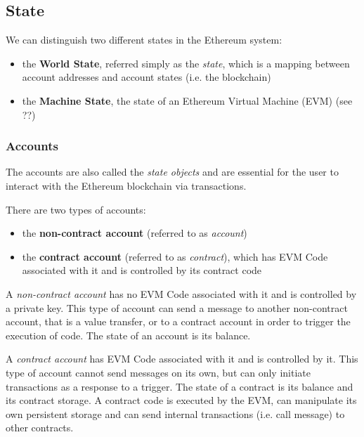 \subsection{State}

We can distinguish two different states in the Ethereum system:

\begin{itemize}
  \item the \textbf{World State}, referred simply as the \emph{state}, which is
  a mapping between account addresses and account states (i.e. the blockchain)
  \item the \textbf{Machine State}, the state of an Ethereum Virtual Machine
  (EVM) (see ??)
\end{itemize}

\subsubsection{Accounts}

The accounts are also called the \emph{state objects} and are essential for the
user to interact with the Ethereum blockchain via transactions.

There are two types of accounts:

\begin{itemize}
  \item the \textbf{non-contract account} (referred to as \emph{account})
  \item the \textbf{contract account} (referred to as \emph{contract}), which
  has EVM Code associated with it and is controlled by its contract code
\end{itemize}

A \emph{non-contract account} has no EVM Code associated with it and is
controlled by a private key. This type of account can send a message to another
non-contract account, that is a value transfer, or to a contract account in
order to trigger the execution of code. The state of an account is its balance.

A \emph{contract account} has EVM Code associated with it and is controlled by
it. This type of account cannot send messages on its own, but can only initiate
transactions as a response to a trigger. The state of a contract is its balance
and its contract storage. A contract code is executed by the EVM, can manipulate
its own persistent storage and can send internal transactions (i.e. call
message) to other contracts.


